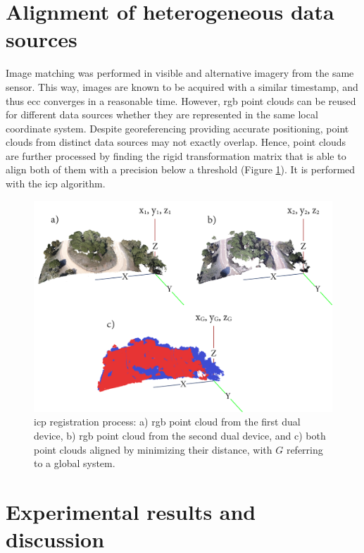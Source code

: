 \section{Alignment of heterogeneous data sources}

Image matching was performed in visible and alternative imagery from the same sensor. This way, images are known to be acquired with a similar timestamp, and thus \acrshort{ecc} converges in a reasonable time. However, \acrshort{rgb} point clouds can be reused for different data sources whether they are represented in the same local coordinate system. Despite georeferencing providing accurate positioning, point clouds from distinct data sources may not exactly overlap. Hence, point clouds are further processed by finding the rigid transformation matrix that is able to align both of them with a precision below a threshold (Figure \ref{fig:icp}). It is performed with the \acrshort{icp} algorithm.

\begin{figure}[ht]
    \centering
    \includegraphics[width=\linewidth]{figs/multi_thermal_projection/ICP.png}
    \caption{\acrshort{icp} registration process: a) \acrshort{rgb} point cloud from the first dual device, b) \acrshort{rgb} point cloud from the second dual device, and c) both point clouds aligned by minimizing their distance, with $G$ referring to a global system.}
    \label{fig:icp}
\end{figure}

\section{Experimental results and discussion}

